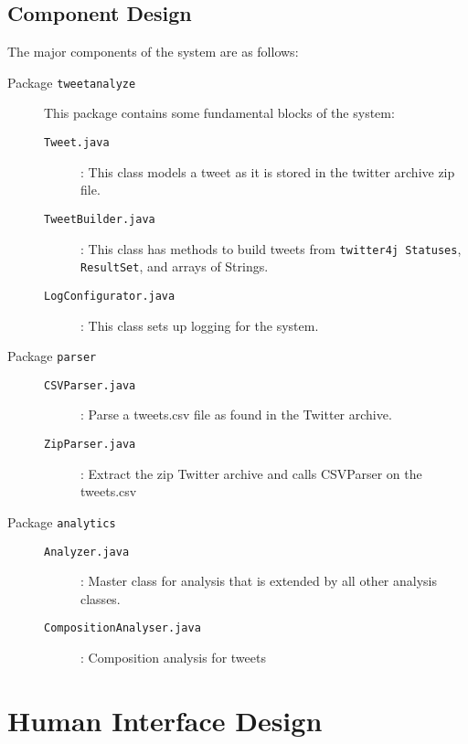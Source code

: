 \documentclass[a4paper, 12pt]{article}
\begin{document}
\subsection{Component Design} \label{sec:component}
\begin{adjustwidth}{1em}{0pt}
The major components of the system are as follows:
\begin{description}
	\item[Package \texttt{tweetanalyze}] This package contains some fundamental blocks of the system:
		\begin{description}
		\item[\texttt{Tweet.java}] : This class models a tweet as it is stored in the twitter archive zip file.
		\item[\texttt{TweetBuilder.java}] : This class has methods to build tweets from \texttt{twitter4j Statuses}, \texttt{ResultSet}, and arrays of Strings.
		\item[\texttt{LogConfigurator.java}] : This class sets up logging for the system.
		\end{description}
	\item[Package \texttt{parser}]
		\begin{description}
		\item[\texttt{CSVParser.java}] : Parse a tweets.csv file as found in the Twitter archive.
		\item[\texttt{ZipParser.java}] : Extract the zip Twitter archive and calls CSVParser on the tweets.csv
	\end{description}	
	\item[Package \texttt{analytics}]
		\begin{description}
		\item[\texttt{Analyzer.java}] : Master class for analysis that is extended by all other analysis classes.
		\item[\texttt{CompositionAnalyser.java}] : Composition analysis for tweets
	\end{description}	
\end{description}
\end{adjustwidth}

\section{Human Interface Design} \label{sec:human}
\end{document}
